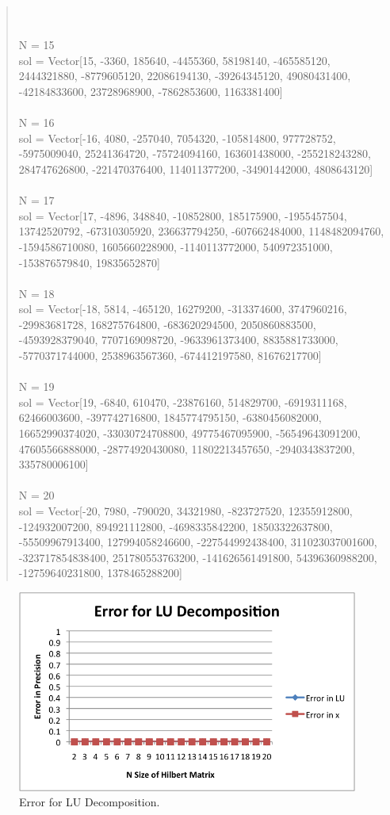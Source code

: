 \documentclass[letterpaper,12pt]{article}
\begin{document}
\begin{quote}
\\
\\N = 15
\\sol = Vector[15, -3360, 185640, -4455360, 58198140, -465585120, 2444321880, -8779605120, 22086194130, -39264345120, 49080431400, -42184833600, 23728968900, -7862853600, 1163381400]
\\
\\N = 16
\\sol = Vector[-16, 4080, -257040, 7054320, -105814800, 977728752, -5975009040, 25241364720, -75724094160, 163601438000, -255218243280, 284747626800, -221470376400, 114011377200, -34901442000, 4808643120]
\\
\\N = 17
\\sol = Vector[17, -4896, 348840, -10852800, 185175900, -1955457504, 13742520792, -67310305920, 236637794250, -607662484000, 1148482094760, -1594586710080, 1605660228900, -1140113772000, 540972351000, -153876579840, 19835652870]
\\
\\N = 18
\\sol = Vector[-18, 5814, -465120, 16279200, -313374600, 3747960216, -29983681728, 168275764800, -683620294500, 2050860883500, -4593928379040, 7707169098720, -9633961373400, 8835881733000, -5770371744000, 2538963567360, -674412197580, 81676217700]
\\
\\N = 19
\\sol = Vector[19, -6840, 610470, -23876160, 514829700, -6919311168, 62466003600, -397742716800, 1845774795150, -6380456082000, 16652990374020, -33030724708800, 49775467095900, -56549643091200, 47605566888000, -28774920430080, 11802213457650, -2940343837200, 335780006100]
\\
\\N = 20
\\sol = Vector[-20, 7980, -790020, 34321980, -823727520, 12355912800, -124932007200, 894921112800, -4698335842200, 18503322637800, -55509967913400, 127994058246600, -227544992438400, 311023037001600, -323717854838400, 251780553763200, -141626561491800, 54396360988200, -12759640231800, 1378465288200]
\end{quote}


\begin{figure}[h] 
  \centering
  \includegraphics{LU.png}
  \caption{\label{LU}Error for LU Decomposition.}
\end{figure}
\end{document}
